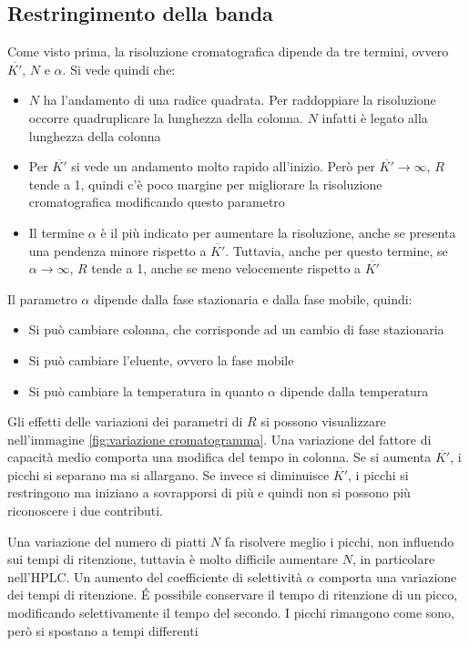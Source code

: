 \subsection{Restringimento della banda}
Come visto prima, la risoluzione cromatografica dipende da tre termini, ovvero $\overline{K'}$, $N$ e $\alpha$. Si vede quindi che:

\begin{itemize}
\item $N$ ha l'andamento di una radice quadrata. Per raddoppiare la risoluzione occorre quadruplicare la lunghezza della colonna. $N$ infatti è legato alla lunghezza della colonna
\item Per $\overline{K'}$ si vede un andamento molto rapido all'inizio. Però per $\overline{K'} \to \infty$, $R$ tende a 1, quindi c'è poco margine per migliorare la risoluzione cromatografica modificando questo parametro
\item Il termine $\alpha$ è il più indicato per aumentare la risoluzione, anche se presenta una pendenza minore rispetto a $\overline{K'}$. Tuttavia, anche per questo termine, se $\alpha \to \infty$, $R$ tende a 1, anche se meno velocemente rispetto a $\overline{K'}$
\end{itemize}
Il parametro $\alpha$ dipende dalla fase stazionaria e dalla fase mobile, quindi:
\begin{itemize}
\item Si può cambiare colonna, che corrisponde ad un cambio di fase stazionaria
\item Si può cambiare l'eluente, ovvero la fase mobile
\item Si può cambiare la temperatura in quanto $\alpha$ dipende dalla temperatura
\end{itemize}
Gli effetti delle variazioni dei parametri di $R$ si possono visualizzare nell'immagine \ref{fig:variazione cromatogramma}. Una variazione del fattore di capacità medio comporta una modifica del tempo in colonna.
Se si aumenta $\overline{K'}$, i picchi si separano ma si allargano. Se invece si diminuisce $\overline{K'}$, i picchi si restringono ma iniziano a sovrapporsi di più e quindi non si possono più riconoscere i due contributi.




Una variazione del numero di piatti $N$ fa risolvere meglio i picchi, non influendo sui tempi di ritenzione, tuttavia è molto difficile aumentare $N$, in particolare nell'HPLC.
Un aumento del coefficiente di selettività $\alpha$ comporta una variazione dei tempi di ritenzione. 
É possibile conservare il tempo di ritenzione di un picco, modificando selettivamente il tempo del secondo.
I picchi rimangono come sono, però si spostano a tempi differenti

